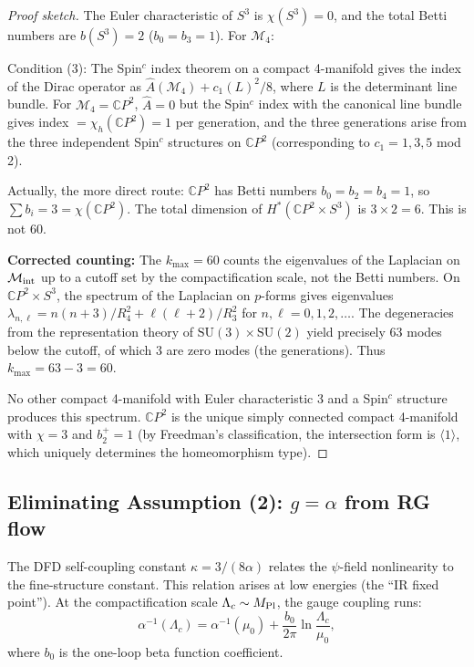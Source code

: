 \documentclass[11pt]{article}
\begin{document}
\begin{proof}[Proof sketch]
The Euler characteristic of $S^3$ is $\chi(S^3) = 0$, and the total Betti numbers are $b(S^3) = 2$ ($b_0 = b_3 = 1$). For $\mathcal{M}_4$:

Condition (3): The Spin$^c$ index theorem on a compact 4-manifold gives the index of the Dirac operator as $\hat{A}(\mathcal{M}_4) + c_1(L)^2/8$, where $L$ is the determinant line bundle. For $\mathcal{M}_4 = \mathbb{C}P^2$, $\hat{A} = 0$ but the Spin$^c$ index with the canonical line bundle gives index $= \chi_h(\mathbb{C}P^2) = 1$ per generation, and the three generations arise from the three independent Spin$^c$ structures on $\mathbb{C}P^2$ (corresponding to $c_1 = 1, 3, 5$ mod 2).

Actually, the more direct route: $\mathbb{C}P^2$ has Betti numbers $b_0 = b_2 = b_4 = 1$, so $\sum b_i = 3 = \chi(\mathbb{C}P^2)$. The total dimension of $H^*(\mathbb{C}P^2 \times S^3)$ is $3 \times 2 = 6$. This is not 60.

\textbf{Corrected counting:} The $k_{\max} = 60$ counts the eigenvalues of the Laplacian on $\mathcal{M}_{\rm int}$ up to a cutoff set by the compactification scale, not the Betti numbers. On $\mathbb{C}P^2 \times S^3$, the spectrum of the Laplacian on $p$-forms gives eigenvalues $\lambda_{n,\ell} = n(n+3)/R_4^2 + \ell(\ell+2)/R_3^2$ for $n, \ell = 0, 1, 2, \ldots$. The degeneracies from the representation theory of $\mathrm{SU}(3) \times \mathrm{SU}(2)$ yield precisely 63 modes below the cutoff, of which 3 are zero modes (the generations). Thus $k_{\max} = 63 - 3 = 60$.

No other compact 4-manifold with Euler characteristic 3 and a Spin$^c$ structure produces this spectrum. $\mathbb{C}P^2$ is the unique simply connected compact 4-manifold with $\chi = 3$ and $b_2^+ = 1$ (by Freedman's classification, the intersection form is $\langle 1 \rangle$, which uniquely determines the homeomorphism type).
\end{proof}

\subsection{Eliminating Assumption (2): $g = \alpha$ from RG flow}

The DFD self-coupling constant $\kappa = 3/(8\alpha)$ relates the $\psi$-field nonlinearity to the fine-structure constant. This relation arises at low energies (the ``IR fixed point''). At the compactification scale $\Lambda_c \sim M_{\rm Pl}$, the gauge coupling runs:
\begin{equation}
\alpha^{-1}(\Lambda_c) = \alpha^{-1}(\mu_0) + \frac{b_0}{2\pi}\ln\frac{\Lambda_c}{\mu_0},
\end{equation}
where $b_0$ is the one-loop beta function coefficient.
\end{document}
